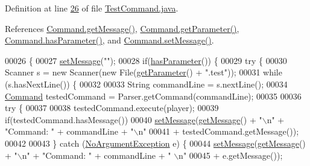 Definition at line \hyperlink{TestCommand_8java_source_l00026}{26} of file \hyperlink{TestCommand_8java_source}{Test\-Command.\-java}.



References \hyperlink{Command_8java_source_l00057}{Command.\-get\-Message()}, \hyperlink{Command_8java_source_l00025}{Command.\-get\-Parameter()}, \hyperlink{Command_8java_source_l00041}{Command.\-has\-Parameter()}, and \hyperlink{Command_8java_source_l00049}{Command.\-set\-Message()}.


\begin{DoxyCode}
00026                                                                                               \{
00027         \hyperlink{classCommand_a715709d8f0ab65879d79ad1725c96f17}{setMessage}(\textcolor{stringliteral}{""});
00028         \textcolor{keywordflow}{if}(\hyperlink{classCommand_a9b042558156d6749566e0fd9d48d3bfe}{hasParameter}()) \{
00029             \textcolor{keywordflow}{try} \{
00030                 Scanner s = \textcolor{keyword}{new} Scanner(\textcolor{keyword}{new} File(\hyperlink{classCommand_a1ced3739d546770ba1389e6ce228255e}{getParameter}() + \textcolor{stringliteral}{".test"}));
00031                 \textcolor{keywordflow}{while} (s.hasNextLine()) \{
00032 
00033                     String commandLine = s.nextLine();
00034                     \hyperlink{classCommand}{Command} testedCommand = Parser.getCommand(commandLine);
00035 
00036                     \textcolor{keywordflow}{try} \{
00037 
00038                         testedCommand.execute(player);
00039                         \textcolor{keywordflow}{if}(testedCommand.hasMessage())
00040                             \hyperlink{classCommand_a715709d8f0ab65879d79ad1725c96f17}{setMessage}(\hyperlink{classCommand_ac3d4abebefb2aea0ce9757bf9c356882}{getMessage}() + \textcolor{stringliteral}{"\(\backslash\)n"} + \textcolor{stringliteral}{"Command: "} + commandLine 
      + \textcolor{stringliteral}{"\(\backslash\)n"}
00041                                     + testedCommand.getMessage());
00042 
00043                     \} \textcolor{keywordflow}{catch} (\hyperlink{classNoArgumentException}{NoArgumentException} e) \{
00044                         \hyperlink{classCommand_a715709d8f0ab65879d79ad1725c96f17}{setMessage}(\hyperlink{classCommand_ac3d4abebefb2aea0ce9757bf9c356882}{getMessage}() + \textcolor{stringliteral}{"\(\backslash\)n"} + \textcolor{stringliteral}{"Command: "} + commandLine + \textcolor{stringliteral}{"
      \(\backslash\)n"}
00045                                 + e.getMessage());

\end{DoxyCode}
